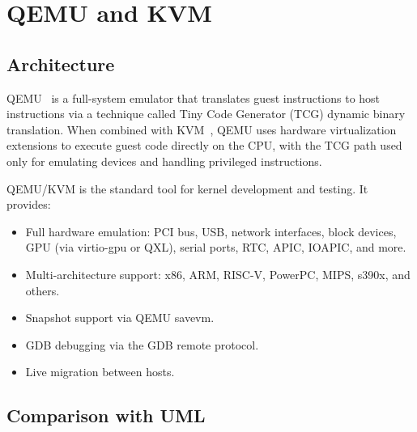 \section{QEMU and KVM}
\label{sec:related-qemu-kvm}

\subsection{Architecture}

QEMU~\cite{bellard2005} is a full-system emulator that translates
guest instructions to host instructions via a technique called
Tiny Code Generator (TCG) dynamic binary translation.  When combined
with KVM~\cite{kivity2007}, QEMU uses hardware virtualization
extensions to execute guest code directly on the CPU, with the TCG
path used only for emulating devices and handling privileged
instructions.

QEMU/KVM is the standard tool for kernel development and testing.
It provides:

\begin{itemize}[leftmargin=2em]
  \item Full hardware emulation: PCI bus, USB, network interfaces,
        block devices, GPU (via virtio-gpu or QXL), serial ports,
        RTC, APIC, IOAPIC, and more.
  \item Multi-architecture support: x86, ARM, RISC-V, PowerPC,
        MIPS, s390x, and others.
  \item Snapshot support via QEMU savevm.
  \item GDB debugging via the GDB remote protocol.
  \item Live migration between hosts.
\end{itemize}

\subsection{Comparison with UML}

